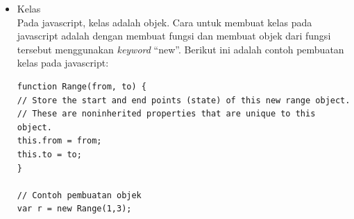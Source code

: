 \begin{enumerate}
\begin{itemize}
\item Kelas \\
Pada javascript, kelas adalah objek. Cara untuk membuat kelas pada javascript
adalah dengan membuat fungsi dan membuat objek dari fungsi tersebut menggunakan
\textit{keyword} ``new''. Berikut ini adalah contoh pembuatan kelas pada
javascript:
\begin{verbatim}
function Range(from, to) {
// Store the start and end points (state) of this new range object.
// These are noninherited properties that are unique to this object.
this.from = from;
this.to = to;
}

// Contoh pembuatan objek
var r = new Range(1,3);
\end{verbatim}
\end{itemize}
\end{enumerate}

